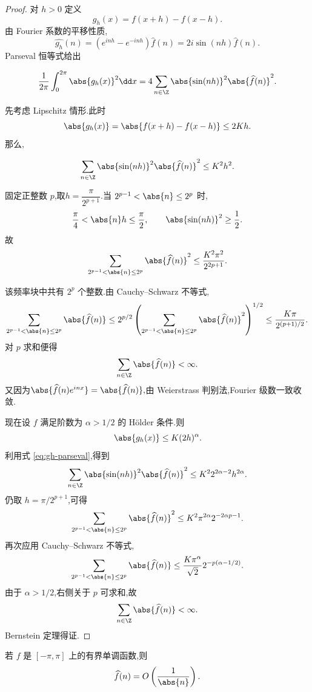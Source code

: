 \begin{proof}
对 $h>0$ 定义
\[
g_h(x)=f(x+h)-f(x-h).
\]
由 Fourier 系数的平移性质,
\[
\widehat{g_h}(n)
=\left(e^{inh}-e^{-inh}\right)\widehat f(n)
=2i\sin(nh)\widehat f(n).
\]
Parseval 恒等式给出

\begin{equation}\label{eq:gh-parseval}
	\frac1{2\pi}\int_0^{2\pi}\abs{g_h(x)}^2\dd x
=4\sum_{n\in\Z}\abs{\sin(nh)}^2\abs{\widehat f(n)}^2.
\end{equation} 


先考虑 Lipschitz 情形.此时
\[
\abs{g_h(x)}
=\abs{f(x+h)-f(x-h)}
\leq2Kh.
\]
那么,

\[ \sum_{n\in\Z}\abs{\sin(nh)}^2\abs{\widehat f(n)}^2
\leq K^2h^2. \]


固定正整数 $p$,取$h=\dfrac{\pi}{2^{p+1}}.$当 $2^{p-1}<\abs{n}\leq2^p$ 时,
\[
\frac{\pi}{4}<\abs{n}h\leq\frac{\pi}{2},
\qquad
\abs{\sin(nh)}^2\geq\frac12.
\]
故\[ \sum_{2^{p-1}<\abs{n}\leq2^p}\abs{\widehat f(n)}^2
\leq\frac{K^2\pi^2}{2^{2p+1}}. \]

该频率块中共有 $2^p$ 个整数.由 Cauchy--Schwarz 不等式,
\[\sum_{2^{p-1}<\abs{n}\leq2^p}\abs{\widehat f(n)}\leq 2^{p/2}
\left(
\sum_{2^{p-1}<\abs{n}\leq2^p}\abs{\widehat f(n)}^2
\right)^{1/2}\leq \frac{K\pi}{2^{(p+1)/2}}.\]
对 $p$ 求和便得
\[
\sum_{n\in\Z}\abs{\widehat f(n)}<\infty.
\]
又因为$\abs{\widehat f(n)e^{inx}}=\abs{\widehat f(n)},$由 Weierstrass 判别法,Fourier 级数一致收敛.

现在设 $f$ 满足阶数为 $\alpha>1/2$ 的 Hölder 条件.则
\[
\abs{g_h(x)}\leq K(2h)^{\alpha}.
\]
利用式 \eqref{eq:gh-parseval},得到
\[
\sum_{n\in\Z}\abs{\sin(nh)}^2\abs{\widehat f(n)}^2
\leq K^2 2^{2\alpha-2}h^{2\alpha}.
\]
仍取 $h=\pi/2^{p+1}$,可得
\[
\sum_{2^{p-1}<\abs{n}\leq2^p}\abs{\widehat f(n)}^2
\leq K^2\pi^{2\alpha}2^{-2\alpha p-1}.
\]
再次应用 Cauchy--Schwarz 不等式,
\[
\sum_{2^{p-1}<\abs{n}\leq2^p}\abs{\widehat f(n)}
\leq\frac{K\pi^{\alpha}}{\sqrt2}
2^{-p(\alpha-1/2)}.
\]
由于 $\alpha>1/2$,右侧关于 $p$ 可求和,故
\[
\sum_{n\in\Z}\abs{\widehat f(n)}<\infty.
\]
Bernstein 定理得证.
\end{proof}
\begin{proposition}
若 $f$ 是 $[-\pi,\pi]$ 上的有界单调函数,则
\[
\widehat f(n)=O\left(\frac1{\abs{n}}\right).
\]
\end{proposition}

